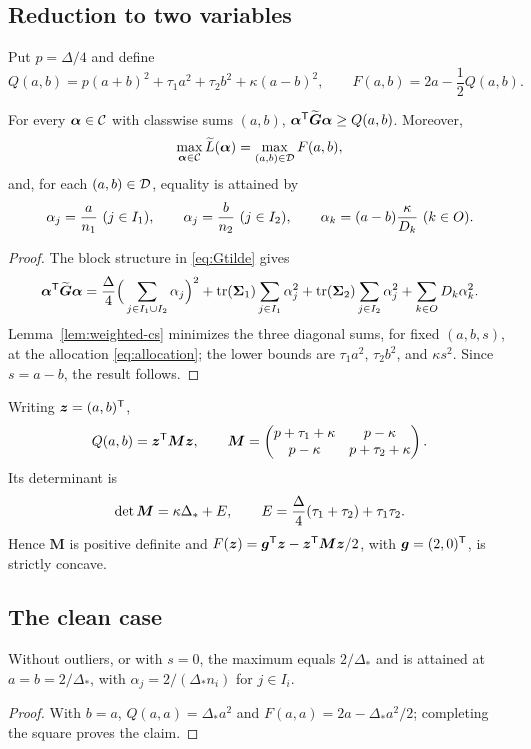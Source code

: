 \subsection{Reduction to two variables}
Put $p=\Delta/4$ and define
\begin{equation}\label{eq:QF}
Q(a,b)=p(a+b)^2+\tau_1a^2+\tau_2b^2+\kappa(a-b)^2,
\qquad
F(a,b)=2a-\frac12Q(a,b).
\end{equation}
\begin{lemma}[Reduction]\label{lem:reduction}
For every $\boldsymbol\alpha\in\mathcal{C}$ with classwise sums $(a,b)$,
$\boldsymbol\alpha^{\mathsf{T}}\widetilde{\boldsymbol G}\boldsymbol\alpha\ge Q(a,b)$. Moreover,
\[
\max_{\boldsymbol\alpha\in\mathcal{C}}\widetilde L(\boldsymbol\alpha)
=
\max_{(a,b)\in\mathcal{D}}F(a,b),
\]
and, for each $(a,b)\in\mathcal{D}$, equality is attained by
\begin{equation}\label{eq:allocation}
\alpha_j={a\over n_1}\ (j\in I_1),\qquad
\alpha_j={b\over n_2}\ (j\in I_2),\qquad
\alpha_k=(a-b){\kappa\over D_k}\ (k\in O).
\end{equation}
\end{lemma}
\begin{proof}
The block structure in \eqref{eq:Gtilde} gives
\[
\boldsymbol\alpha^{\mathsf{T}}\widetilde{\boldsymbol G}\boldsymbol\alpha
={\Delta\over4}\Big(\sum_{j\in I_1\cup I_2}\alpha_j\Big)^2
+\operatorname{tr}(\boldsymbol\Sigma_1)\sum_{j\in I_1}\alpha_j^2
+\operatorname{tr}(\boldsymbol\Sigma_2)\sum_{j\in I_2}\alpha_j^2
+\sum_{k\in O}D_k\alpha_k^2.
\]
Lemma~\ref{lem:weighted-cs} minimizes the three diagonal sums, for fixed $(a,b,s)$, at the allocation \eqref{eq:allocation}; the lower bounds are $\tau_1a^2$, $\tau_2b^2$, and $\kappa s^2$. Since $s=a-b$, the result follows.
\end{proof}

Writing $\boldsymbol z=(a,b)^{\mathsf{T}}$,
\[
Q(a,b)=\boldsymbol z^{\mathsf{T}}\boldsymbol M\boldsymbol z,
\qquad
\boldsymbol M=
\begin{pmatrix}p+\tau_1+\kappa&p-\kappa\\p-\kappa&p+\tau_2+\kappa\end{pmatrix}.
\]
Its determinant is
\begin{equation}\label{eq:detM}
\det\boldsymbol M=\kappa\Delta_*+E,
\qquad
E={\Delta\over4}(\tau_1+\tau_2)+\tau_1\tau_2.
\end{equation}
Hence $\boldsymbol M$ is positive definite and $F(\boldsymbol z)=\boldsymbol g^{\mathsf{T}}\boldsymbol z-\boldsymbol z^{\mathsf{T}}\boldsymbol M\boldsymbol z/2$, with $\boldsymbol g=(2,0)^{\mathsf{T}}$, is strictly concave.

\subsection{The clean case}
\begin{proposition}\label{prop:clean}
Without outliers, or with $s=0$, the maximum equals $2/\Delta_*$ and is attained at $a=b=2/\Delta_*$, with $\alpha_j=2/(\Delta_*n_i)$ for $j\in I_i$.
\end{proposition}
\begin{proof}
With $b=a$, $Q(a,a)=\Delta_*a^2$ and
$F(a,a)=2a-\Delta_*a^2/2$; completing the square proves the claim.
\end{proof}
